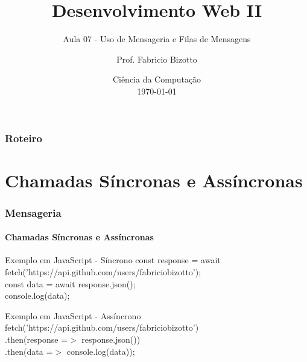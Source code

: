 \documentclass[
	9pt, %
	t, %
]{beamer}
\title[DesWebII]{Desenvolvimento Web II} %
\subtitle{Aula 07 - Uso de Mensageria e Filas de Mensagens} %
\author[Fabricio Bizotto]{Prof. Fabricio Bizotto} %
\institute[IFC]{Instituto Federal Catarinense \\ \smallskip \textit{fabricio.bizotto@ifc.edu.br}} %
\date[\today]{Ciência da Computação \\ \today} %
\begin{document}

\begin{frame}
	\titlepage %
\end{frame}


\begin{frame}
	\frametitle{Roteiro} %

	\tableofcontents %
\end{frame}


\section{Chamadas Síncronas e Assíncronas}

\begin{frame}
	\frametitle{Mensageria}
	\framesubtitle{Chamadas Síncronas e Assíncronas}

	\begin{exampleblock}{Exemplo em JavaScript - Síncrono}
		const response = await fetch('https://api.github.com/users/fabriciobizotto');\\
		const data = await response.json();\\
		console.log(data);\\
	\end{exampleblock}

	\begin{exampleblock}{Exemplo em JavaScript - Assíncrono}
		fetch('https://api.github.com/users/fabriciobizotto')\\
		.then(response =$>$ response.json())\\
		.then(data =$>$ console.log(data));\\
	\end{exampleblock}

\end{frame}
\end{document}
